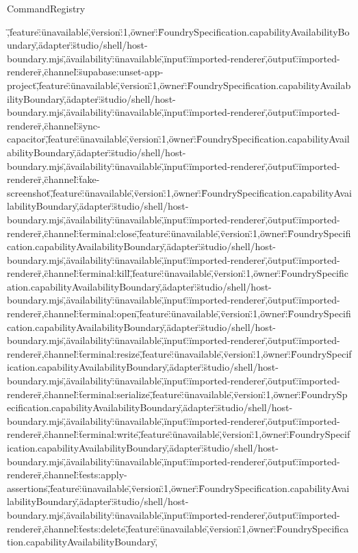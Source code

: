 \begin{lexlean}{CommandRegistry}
\begin{semanticmodule}
{\",\"feature\":\"unavailable\",\"version\":1,\"owner\":\"FoundrySpecification.capabilityAvailabilityBoundary\",\"adapter\":\"studio/shell/host-boundary.mjs\",\"availability\":\"unavailable\",\"input\":\"imported-renderer\",\"output\":\"imported-renderer\"},{\"channel\":\"supabase:unset-app-project\",\"feature\":\"unavailable\",\"version\":1,\"owner\":\"FoundrySpecification.capabilityAvailabilityBoundary\",\"adapter\":\"studio/shell/host-boundary.mjs\",\"availability\":\"unavailable\",\"input\":\"imported-renderer\",\"output\":\"imported-renderer\"},{\"channel\":\"sync-capacitor\",\"feature\":\"unavailable\",\"version\":1,\"owner\":\"FoundrySpecification.capabilityAvailabilityBoundary\",\"adapter\":\"studio/shell/host-boundary.mjs\",\"availability\":\"unavailable\",\"input\":\"imported-renderer\",\"output\":\"imported-renderer\"},{\"channel\":\"take-screenshot\",\"feature\":\"unavailable\",\"version\":1,\"owner\":\"FoundrySpecification.capabilityAvailabilityBoundary\",\"adapter\":\"studio/shell/host-boundary.mjs\",\"availability\":\"unavailable\",\"input\":\"imported-renderer\",\"output\":\"imported-renderer\"},{\"channel\":\"terminal:close\",\"feature\":\"unavailable\",\"version\":1,\"owner\":\"FoundrySpecification.capabilityAvailabilityBoundary\",\"adapter\":\"studio/shell/host-boundary.mjs\",\"availability\":\"unavailable\",\"input\":\"imported-renderer\",\"output\":\"imported-renderer\"},{\"channel\":\"terminal:kill\",\"feature\":\"unavailable\",\"version\":1,\"owner\":\"FoundrySpecification.capabilityAvailabilityBoundary\",\"adapter\":\"studio/shell/host-boundary.mjs\",\"availability\":\"unavailable\",\"input\":\"imported-renderer\",\"output\":\"imported-renderer\"},{\"channel\":\"terminal:open\",\"feature\":\"unavailable\",\"version\":1,\"owner\":\"FoundrySpecification.capabilityAvailabilityBoundary\",\"adapter\":\"studio/shell/host-boundary.mjs\",\"availability\":\"unavailable\",\"input\":\"imported-renderer\",\"output\":\"imported-renderer\"},{\"channel\":\"terminal:resize\",\"feature\":\"unavailable\",\"version\":1,\"owner\":\"FoundrySpecification.capabilityAvailabilityBoundary\",\"adapter\":\"studio/shell/host-boundary.mjs\",\"availability\":\"unavailable\",\"input\":\"imported-renderer\",\"output\":\"imported-renderer\"},{\"channel\":\"terminal:serialize\",\"feature\":\"unavailable\",\"version\":1,\"owner\":\"FoundrySpecification.capabilityAvailabilityBoundary\",\"adapter\":\"studio/shell/host-boundary.mjs\",\"availability\":\"unavailable\",\"input\":\"imported-renderer\",\"output\":\"imported-renderer\"},{\"channel\":\"terminal:write\",\"feature\":\"unavailable\",\"version\":1,\"owner\":\"FoundrySpecification.capabilityAvailabilityBoundary\",\"adapter\":\"studio/shell/host-boundary.mjs\",\"availability\":\"unavailable\",\"input\":\"imported-renderer\",\"output\":\"imported-renderer\"},{\"channel\":\"tests:apply-assertions\",\"feature\":\"unavailable\",\"version\":1,\"owner\":\"FoundrySpecification.capabilityAvailabilityBoundary\",\"adapter\":\"studio/shell/host-boundary.mjs\",\"availability\":\"unavailable\",\"input\":\"imported-renderer\",\"output\":\"imported-renderer\"},{\"channel\":\"tests:delete\",\"feature\":\"unavailable\",\"version\":1,\"owner\":\"FoundrySpecification.capabilityAvailabilityBoundary\",}
\end{semanticmodule}
\end{lexlean}
